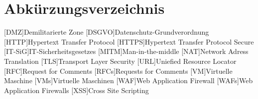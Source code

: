 \tableofcontents
\pagebreak

\section{Abkürzungsverzeichnis}

\begin{acronym}
    [DMZ]{Demilitarierte Zone}
    [DSGVO]{Datenschutz-Grundverordnung}
    [HTTP]{Hypertext Transfer Protocol}
    [HTTPS]{Hypertext Transfer Protocol Secure}
    [IT-SiG]{IT-Sicherheitsgesetzes}
    [MITM]{Man-in-the-middle}
    [NAT]{Network Adress Translation}
    [TLS]{Transport Layer Security}
    [URL]{Uniefied Resource Locator}
    [RFC]{Request for Comments}
    [RFCs]{Requests for Comments}
    [VM]{Virtuelle Maschine}
    [VMs]{Virtuelle Maschinen}
    [WAF]{Web Application Firewall}
    [WAFs]{Web Application Firewalls}
    [XSS]{Cross Site Scripting}
\end{acronym}

\pagebreak

\listoffigures

\pagebreak